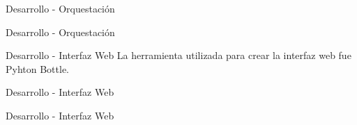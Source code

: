 \begin{frame}{Desarrollo - Orquestación}
    \vspace{-1.5cm}
    \begin{figure}[ht]
       \centering
       \vspace{-0.50cm}
    \end{figure}

\end{frame}

\begin{frame}{Desarrollo - Orquestación}
    \vspace{-1.5cm}
    \begin{figure}[ht]
       \centering
       \vspace{-0.50cm}
    \end{figure}

\end{frame}

\begin{frame}{Desarrollo - Interfaz Web}
    \vspace{-1.5cm}
    La herramienta utilizada para crear la interfaz web fue Pyhton Bottle.

\end{frame}

\begin{frame}{Desarrollo - Interfaz Web}
    \vspace{-1.5cm}
    \begin{figure}[ht]
       \centering
       \vspace{-0.50cm}
    \end{figure}

\end{frame}

\begin{frame}{Desarrollo - Interfaz Web}
    \vspace{-1.5cm}
    \begin{figure}[ht]
       \centering
       \vspace{-0.50cm}
    \end{figure}

\end{frame}
